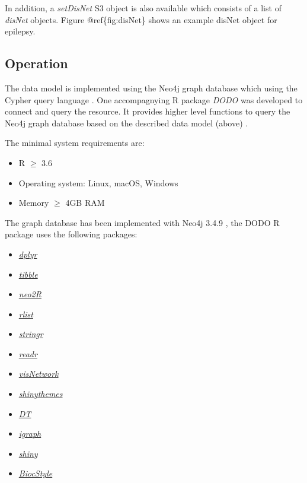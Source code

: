 \documentclass[9pt,a4paper,]{extarticle}
\begin{document}
In addition, a \emph{setDisNet} S3 object is also available which consists of a list of \emph{disNet} objects. Figure @ref\{fig:disNet\} shows an example disNet object for epilepsy.

\hypertarget{operation}{%
\subsection{Operation}\label{operation}}

The data model is implemented using the Neo4j graph database which using the Cypher query language \citep{Neo4j2020}. One accompagnying R package \emph{DODO} was developed to connect and query the resource. It provides higher level functions to query the Neo4j graph database based on the described data model (above) \citep{R2019}.

The minimal system requirements are:

\begin{itemize}
\item
  R \(\geq\) 3.6
\item
  Operating system: Linux, macOS, Windows
\item
  Memory \(\geq\) 4GB RAM
\end{itemize}

The graph database has been implemented with Neo4j 3.4.9 \citep{Neo4j2020}, the DODO R package uses the following packages:

\begin{itemize}
\item
  \emph{\href{https://CRAN.R-project.org/package=dplyr}{dplyr}} \citep{Wickham2019}
\item
  \emph{\href{https://CRAN.R-project.org/package=tibble}{tibble}} \citep{Muller2019}
\item
  \emph{\href{https://CRAN.R-project.org/package=neo2R}{neo2R}} \citep{Godard2020}
\item
  \emph{\href{https://CRAN.R-project.org/package=rlist}{rlist}} \citep{Ren2016}
\item
  \emph{\href{https://CRAN.R-project.org/package=stringr}{stringr}} \citep{Wickham2019b}
\item
  \emph{\href{https://CRAN.R-project.org/package=readr}{readr}} \citep{Wickham2018}
\item
  \emph{\href{https://CRAN.R-project.org/package=visNetwork}{visNetwork}} \citep{Almende2017}
\item
  \emph{\href{https://CRAN.R-project.org/package=shinythemes}{shinythemes}} \citep{Chang2018}
\item
  \emph{\href{https://CRAN.R-project.org/package=DT}{DT}} \citep{Xie2019}
\item
  \emph{\href{https://CRAN.R-project.org/package=igraph}{igraph}} \citep{Csardi2006}
\item
  \emph{\href{https://CRAN.R-project.org/package=shiny}{shiny}} \citep{Chang2019}
\item
  \emph{\href{https://CRAN.R-project.org/package=BiocStyle}{BiocStyle}}\citep{Oles2020}
\end{itemize}
\end{document}
